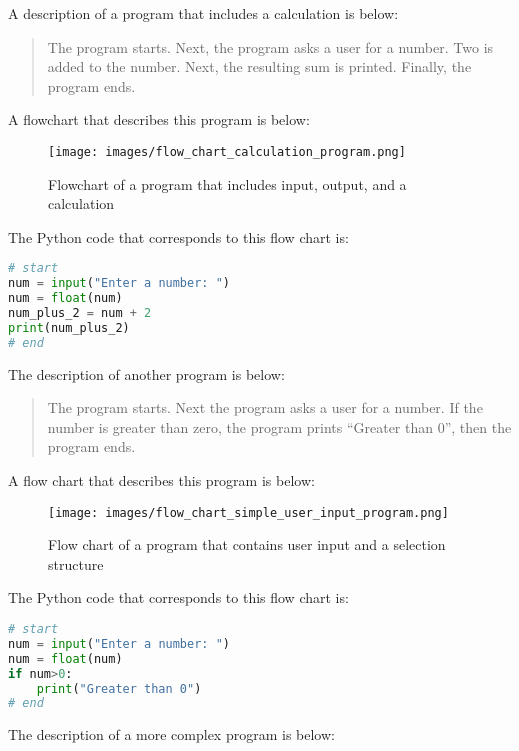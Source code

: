 \documentclass{book}
\makeatletter
\def\maxwidth{\ifdim\Gin@nat@width>\linewidth\linewidth
\else\Gin@nat@width\fi}
\let\Oldincludegraphics\includegraphics
\renewcommand{\includegraphics}[1]{\Oldincludegraphics[width=.8\maxwidth]{#1}}
\makeatother
\begin{document}
    
        A description of a program that includes a calculation is below:

\begin{quote}
The program starts. Next, the program asks a user for a number. Two is
added to the number. Next, the resulting sum is printed. Finally, the
program ends.
\end{quote}

A flowchart that describes this program is below:

\begin{figure}
\centering
\texttt{[image: images/flow\_chart\_calculation\_program.png]}
\caption{Flowchart of a program that includes input, output, and a
calculation}
\end{figure}

The Python code that corresponds to this flow chart is:

\begin{lstlisting}[language=Python]
# start
num = input("Enter a number: ")
num = float(num)
num_plus_2 = num + 2
print(num_plus_2)
# end
\end{lstlisting}
    




    
        The description of another program is below:

\begin{quote}
The program starts. Next the program asks a user for a number. If the
number is greater than zero, the program prints ``Greater than 0'', then
the program ends.
\end{quote}

A flow chart that describes this program is below:

\begin{figure}
\centering
\texttt{[image: images/flow\_chart\_simple\_user\_input\_program.png]}
\caption{Flow chart of a program that contains user input and a
selection structure}
\end{figure}

The Python code that corresponds to this flow chart is:

\begin{lstlisting}[language=Python]
# start
num = input("Enter a number: ")
num = float(num)
if num>0:
    print("Greater than 0")
# end
\end{lstlisting}
    




    
        The description of a more complex program is below:
\end{document}
